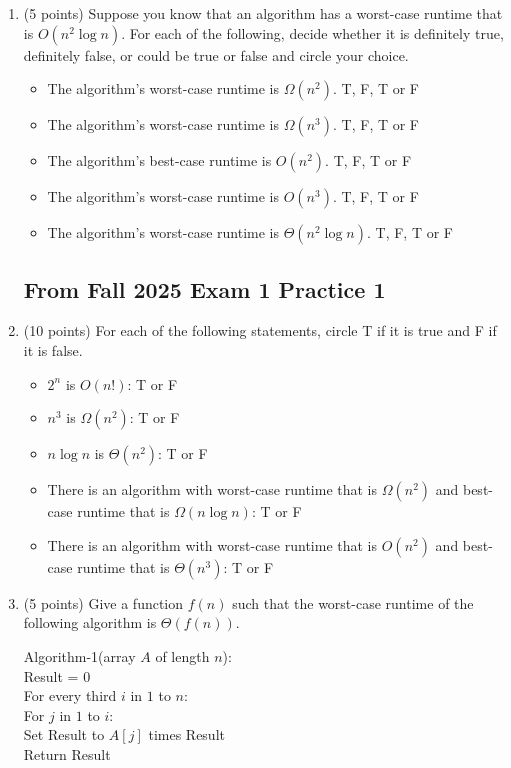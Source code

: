 \documentclass[11pt]{article}
\begin{document}
\begin{enumerate}
\item (5 points) 
Suppose you know that an algorithm has a worst-case runtime that is $O(n^2 \log n)$. For each of the following, decide whether it is definitely true, definitely false, or could be true or false and circle your choice. 

\begin{itemize}
    \item The algorithm's worst-case runtime is $\Omega(n^2)$. T, F, T or F
    \item The algorithm's worst-case runtime is $\Omega(n^3)$. T, F, T or F
    \item The algorithm's best-case runtime is $O(n^2)$. T, F, T or F
    \item The algorithm's worst-case runtime is $O(n^3)$. T, F, T or F
    \item The algorithm's worst-case runtime is $\Theta(n^2 \log n)$. T, F, T or F
\end{itemize}


\newpage

\subsection*{From Fall 2025 Exam 1 Practice 1}
\item (10 points)
For each of the following statements, circle T if it is true and F if it is false.

\begin{itemize}
    \item $2^n$ is $O(n!)$: T or F
    \item $n^3$ is $\Omega(n^2)$: T or F
    \item $n \log n$ is $\Theta(n^2)$: T or F
    \item There is an algorithm with worst-case runtime that is $\Omega(n^2)$ and best-case runtime that is $\Omega(n \log n)$: T or F
    \item There is an algorithm with worst-case runtime that is $O(n^2)$ and best-case runtime that is $\Theta(n^3)$: T or F
\end{itemize}

\item (5 points) Give a function $f(n)$ such that the worst-case runtime of the following algorithm is $\Theta(f(n))$. 

    \begin{algo}
    Algorithm-1(array $A$ of length $n$):\+\\
    Result = 0\\
    For every third $i$ in $1$ to $n$:\+\\
    For $j$ in $1$ to $i$:\+\\
    Set Result to $A[j]$ times Result\-\- \\
    Return Result\\
    \end{algo} 


\end{enumerate}
\end{document}
